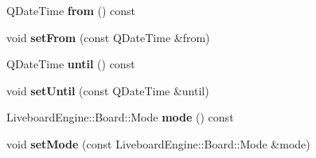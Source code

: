 \begin{DoxyCompactItemize}
\item 
\mbox{\label{classLiveboardEngine_1_1Board_a23f1e2c32589a58dfe13a939cd6b1eae}} 
Q\+Date\+Time {\bfseries from} () const
\item 
\mbox{\label{classLiveboardEngine_1_1Board_a54367a8ed3f970e4b5a11667e07196e2}} 
void {\bfseries set\+From} (const Q\+Date\+Time \&from)
\item 
\mbox{\label{classLiveboardEngine_1_1Board_a37b083f54af4b4950342ef3fb526d4da}} 
Q\+Date\+Time {\bfseries until} () const
\item 
\mbox{\label{classLiveboardEngine_1_1Board_a9618784ccc0e9a6df84f35f0bcc83785}} 
void {\bfseries set\+Until} (const Q\+Date\+Time \&until)
\item 
\mbox{\label{classLiveboardEngine_1_1Board_ac176d818e8f72ed241852b7487dfc49b}} 
Liveboard\+Engine\+::\+Board\+::\+Mode {\bfseries mode} () const
\item 
\mbox{\label{classLiveboardEngine_1_1Board_aff2aefd7d785e700e122f21563072e66}} 
void {\bfseries set\+Mode} (const Liveboard\+Engine\+::\+Board\+::\+Mode \&mode)
\end{DoxyCompactItemize}
